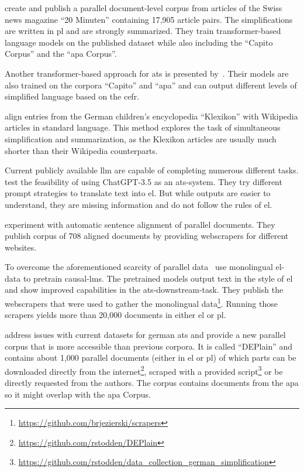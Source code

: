 \textcite{rios-etal-2021-new} create and publish a parallel document-level corpus from articles of the Swiss news magazine \enquote{20 Minuten} containing 17,905 article pairs.
The simplifications are written in \gls{pl} and are strongly summarized.
They train transformer-based language models on the published dataset while also including the \enquote{Capito Corpus} and the \enquote{\gls{apa} Corpus}.

Another transformer-based approach for \gls{ats} is presented by~\textcite{spring-etal-2021-exploring}.
Their models are also trained on the corpora \enquote{Capito} and \enquote{\gls{apa}} and can output different levels of simplified language based on the \gls{cefr}.

\textcite{aumiller2022klexikon} align entries from the German children’s encyclopedia \enquote{Klexikon} with Wikipedia articles in standard language.
This method explores the task of simultaneous simplification and summarization, as the Klexikon articles are usually much shorter than their Wikipedia counterparts.

Current publicly available \gls{llm} are capable of completing numerous different tasks.
\textcite{deilen2023using} test the feasibility of using ChatGPT-3.5 as an \gls{ats}-system.
They try different prompt strategies to translate text into \gls{el}.
But while outputs are easier to understand, they are missing information and do not follow the rules of \gls{el}.

\textcite{toborek2023new} experiment with automatic sentence alignment of parallel documents.
They publish corpus of 708 aligned documents by providing \gls{webscraper}s for different websites.

To overcome the aforementioned scarcity of parallel data~\textcite{Ansch_tz_2023} use monolingual \gls{el}-data to pretrain \gls{causal-lm}s.
The pretrained models output text in the style of \gls{el} and show improved capabilities in the \gls{ats}-downstream-task.
They publish the \gls{webscraper}s that were used to gather the monolingual data\footnote{\url{https://github.com/brjezierski/scrapers}}.
Running those scrapers yields more than 20,000 documents in either \gls{el} or \gls{pl}.

\textcite{stodden-etal-2023-deplain} address issues with current datasets for german \gls{ats} and provide a new parallel corpus that is more accessible than previous corpora.
It is called \enquote{DEPlain} and contains about 1,000 parallel documents (either in \gls{el} or \gls{pl}) of which parts can be downloaded directly from the internet\footnote{\url{https://github.com/rstodden/DEPlain}}, scraped with a provided script\footnote{\url{https://github.com/rstodden/data_collection_german_simplification}} or be directly requested from the authors.
The corpus contains documents from the \gls{apa} so it might overlap with the \gls{apa} Corpus.

